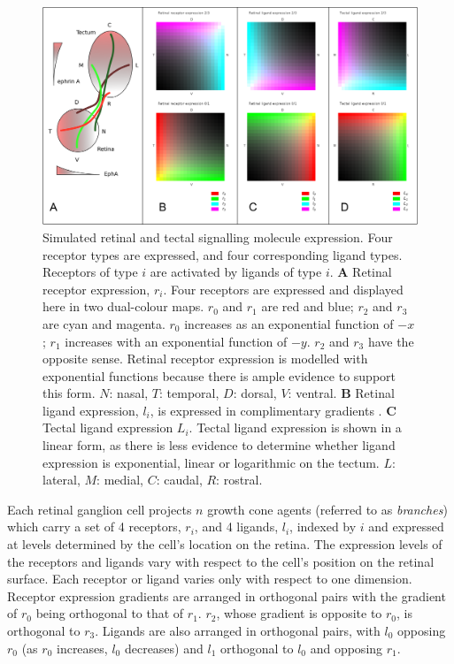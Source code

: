 \documentclass[11pt, a4paper]{article}
\begin{document}
\begin{figure}
\includegraphics[width=\linewidth]{./images/expressions_fig.png}
\caption{Simulated retinal and tectal signalling molecule expression. Four
receptor types are expressed, and four corresponding ligand types. Receptors
of type $i$ are activated by ligands of type $i$.
%
\textbf{A} Retinal receptor expression, $r_i$. Four receptors are expressed and
displayed here in two dual-colour maps. $r_0$ and $r_1$ are red and blue;
$r_2$ and $r_3$ are cyan and magenta. $r_0$ increases as an exponential
function of $-x$; $r_1$ increases with an exponential function of $-y$. $r_2$
and $r_3$ have the opposite sense. Retinal receptor expression is modelled
with exponential functions because there is ample evidence to support this
form. $N$: nasal, $T$: temporal, $D$: dorsal, $V$: ventral.
%
\textbf{B} Retinal ligand expression, $l_i$, is expressed in complimentary
gradients \citep{hornberger_modulation_1999}.
%
\textbf{C} Tectal ligand expression $L_i$. Tectal ligand expression is shown in a linear form,
as there is less evidence to determine whether ligand expression is
exponential, linear or logarithmic on the tectum.
$L$: lateral, $M$: medial, $C$: caudal, $R$: rostral.
}
\label{f:ex}
\end{figure}

Each retinal ganglion cell projects $n$ growth cone agents (referred to
as \emph{branches}) which carry a set of 4 receptors, $r_i$, and 4 ligands,
$l_i$, indexed by $i$ and expressed at levels determined by the cell's
location on the retina. The expression levels of the receptors and ligands
vary with respect to the cell's position on the retinal surface. Each receptor
or ligand varies only with respect to one dimension.  Receptor expression
gradients are arranged in orthogonal pairs with the gradient of $r_0$ being
orthogonal to that of $r_1$. $r_2$, whose gradient is opposite to $r_0$, is
orthogonal to $r_3$. Ligands are also arranged in orthogonal pairs, with $l_0$
opposing $r_0$ (as $r_0$ increases, $l_0$ decreases) and $l_1$ orthogonal to
$l_0$ and opposing $r_1$.
\end{document}
